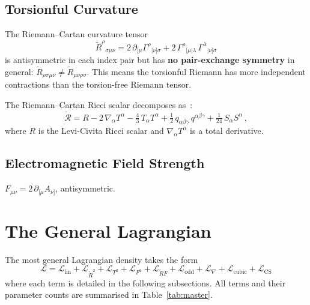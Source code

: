 \documentclass[12pt,a4paper]{article}
\newcommand{\Rt}{\tilde{R}}         %
\newcommand{\Ric}{\tilde{\mathcal{R}}} %
\newcommand{\del}{\nabla}            %
\newcommand{\pd}{\partial}           %
\begin{document}
\subsection{Torsionful Curvature}

The Riemann--Cartan curvature tensor
\begin{equation}
  \Rt^\rho{}_{\sigma\mu\nu}
  = 2\,\pd_{[\mu}\Gamma^\rho{}_{|\nu]\sigma}
  + 2\,\Gamma^\rho{}_{[\mu|\lambda}\,\Gamma^\lambda{}_{|\nu]\sigma}
  \label{eq:curvature_def}
\end{equation}
is antisymmetric in each index pair but has \textbf{no pair-exchange
symmetry} in general: $\Rt_{\rho\sigma\mu\nu} \neq \Rt_{\mu\nu\rho\sigma}$.
This means the torsionful Riemann has more independent contractions
than the torsion-free Riemann tensor.

The Riemann--Cartan Ricci scalar decomposes as~\cite{Shapiro:2001rz}:
\begin{equation}
  \Ric = R - 2\,\del_\alpha T^\alpha
  - \tfrac{4}{3}\, T_\alpha T^\alpha
  + \tfrac{1}{2}\, q_{\alpha\beta\gamma}\, q^{\alpha\beta\gamma}
  + \tfrac{1}{24}\, S_\alpha S^\alpha\,,
  \label{eq:ricci_scalar_decomp}
\end{equation}
where $R$ is the Levi-Civita Ricci scalar and $\del_\alpha T^\alpha$
is a total derivative.

\subsection{Electromagnetic Field Strength}

$F_{\mu\nu} = 2\,\pd_{[\mu} A_{\nu]}$, antisymmetric.


\section{The General Lagrangian}
\label{sec:lagrangian}

The most general Lagrangian density takes the form
\begin{equation}
\boxed{
  \mathcal{L} = \mathcal{L}_{\text{lin}}
  + \mathcal{L}_{\Rt^2} + \mathcal{L}_{T^2}
  + \mathcal{L}_{F^2} + \mathcal{L}_{\Rt F}
  + \mathcal{L}_{\text{odd}}
  + \mathcal{L}_{\del}
  + \mathcal{L}_{\text{cubic}}
  + \mathcal{L}_{\text{CS}}
}
  \label{eq:master}
\end{equation}
where each term is detailed in the following subsections. All terms
and their parameter counts are summarised in
Table~\ref{tab:master}.
\end{document}
